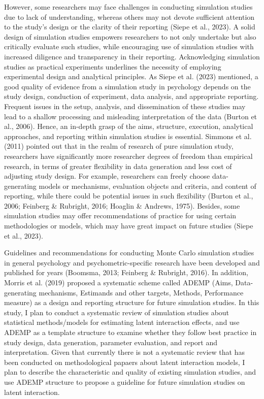 \documentclass[
  11pt,
  man]{apa6}
\begin{document}
However, some researchers may face challenges in conducting simulation studies due to lack of understanding, whereas others may not devote sufficient attention to the study's design or the clarity of their reporting (Siepe et al., 2023). A solid design of simulation studies empowers researchers to not only undertake but also critically evaluate such studies, while encouraging use of simulation studies with increased diligence and transparency in their reporting. Acknowledging simulation studies as practical experiments underlines the necessity of employing experimental design and analytical principles. As Siepe et al. (2023) mentioned, a good quality of evidence from a simulation study in psychology depends on the study design, conduction of experiment, data analysis, and appropriate reporting. Frequent issues in the setup, analysis, and dissemination of these studies may lead to a shallow processing and misleading interpretation of the data (Burton et al., 2006). Hence, an in-depth grasp of the aims, structure, execution, analytical approaches, and reporting within simulation studies is essential. Simmons et al. (2011) pointed out that in the realm of research of pure simulation study, researchers have significantly more researcher degrees of freedom than empirical research, in terms of greater flexibility in data generation and less cost of adjusting study design. For example, researchers can freely choose data-generating models or mechanisms, evaluation objects and criteria, and content of reporting, while there could be potential issues in such flexibility (Burton et al., 2006; Feinberg \& Rubright, 2016; Hoaglin \& Andrews, 1975). Besides, some simulation studies may offer recommendations of practice for using certain methodologies or models, which may have great impact on future studies (Siepe et al., 2023).

Guidelines and recommendations for conducting Monte Carlo simulation studies in general psychology and psychometric-specific research have been developed and published for years (Boomsma, 2013; Feinberg \& Rubright, 2016). In addition, Morris et al. (2019) proposed a systematic scheme called ADEMP (Aims, Data-generating mechanisms, Estimands and other targets, Methods, Performance measure) as a design and reporting structure for future simulation studies. In this study, I plan to conduct a systematic review of simulation studies about statistical methods/models for estimating latent interaction effects, and use ADEMP as a template structure to examine whether they follow best practice in study design, data generation, parameter evaluation, and report and interpretation. Given that currently there is not a systematic review that has been conducted on methodological papaers about latent interaction models, I plan to describe the characteristic and quality of existing simulation studies, and use ADEMP structure to propose a guideline for future simulation studies on latent interaction.
\end{document}
